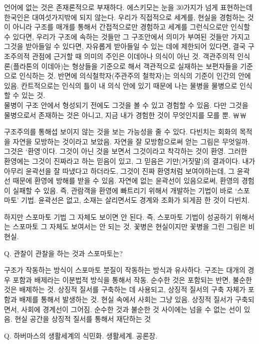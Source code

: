 \documentclass{article}
\begin{document}
언어에 없는 것은 존재론적으로 부재하다. 에스키모는 눈을 30가지가 넘게 표현하는데 한국인은 대여섯가지밖에 되지 않는다. 우리가 직접적으로 세계를, 현실을 경험하는 것이 아니라 구조를 매개를 통해서 간접적으로만 경험하고 세계를 그런식으로만 인식할 수 있다면, 우리가 구조에 속하는 것들만 그 구조안에서 의미가 부여된 것들만 가지고 그것을 받아들일 수 있다면, 자유롭게 받아들일 수 있는 데에 제한되어 있다면, 결국 구조주의적 관점에 근거할 때 의미의 주인은 이데아나 의식이 아닌 것. 객관주의적 인식론(플라톤의 이데아)는 형상들을 기준으로 해서 객관적으로 실재하는 보편자들을 기준으로 인식하는 것. 반면에 의식철학자(주관주의 철학자)는 의식의 기준이 인간의 안에 있음. 칸트적으로는 인식의 틀이 내 의식 안에 있기 때문에 나는 물병을 물병으로 인식할 수 있는 것. \\

물병이 구조 안에서 형성되기 전에도 그것을 볼 수 있고 경험할 수 있음. 다만 그것을 물병으로서 존재하는 것은 아니고, 지금 내가 경험한 것이 무엇인지를 모를 뿐. ￦￦

구조주의를 통해섭 보이지 않는 것을 보는 가능성을 줄 수 있다. 다빈치는 회화의 목적을 자연을 모방하는 것이라고 보았음. 자연을 잘 모방함으로써 얻는 그림은 무엇일까. 그것은 `환영'이다. 그것이 아닌 것을 보면서 그것이라고 착각하는 것이 환영. 그러한 환영에는 그것이 진짜라고 하는 믿음이 있고, 그 믿음은 기만(거짓말)의 결과이다. 내가 아무리 윤곽선을 잘 따냈다고 하더라도, 그것이 진짜 환영처럼 보여야하는데, 그 윤곽선 때문에 환영에 방해를 받을 수 있음. 자연에 없는 윤곽선이 있음으로써, 환영의 경험이 실패할 수 있음. 즉, 관람객을 환영에 빠트리기 위해서 개발하는 기법이 바로 `스포마토' 기법. 윤곽선은 없고, 소재는 살리면서도 경계와 조화가 되게끔 한 것이 다빈치.

하지만 스포마토 기법 그 자체도 보이면 안 된다. 즉, 스포마토 기법이 성공하기 위해서는 스포마토 그 자체도 보여서는 안 되는 것. 꽃병은 현실이지만 꽃병을 그린 그림은 비현실. 

Q. 관찰이 관찰을 하는 것과 스포마토는?

구조가 작동하는 방식이 스포마토 붓질이 작동하는 방식과 유사하다. 구조는 대개의 경우 포함과 배제라는 이분법적 방식을 통해서 작동. 순수한 것은 포함되는 반면, 불순한 것은 배제하는 것. 상징적 질서를 구축하는 데 사용되고, 상징적 질서의 구축 자체가 포함과 배제를 통해서 발생하는 것. 현실 속에서 사회는 그냥 있음. 상징적 질서가 구축되면서, 사회에 경계선이 그어짐. 순수한 것과 불순한 것 사이에는 넘을 수 없는 선이 있음. 현실 공간을 상징적 질서를 통해서 재단하는 것

Q. 하버마스의 생활세계의 식민화. 생활세계. 공론장.
\end{document}
